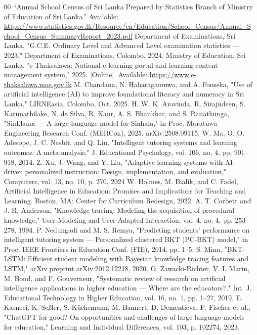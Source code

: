 \documentclass[conference]{IEEEtran}
\begin{document}
{\footnotesize
\begin{thebibliography}{00}
 “Annual School Census of Sri Lanka Prepared by Statistics Branch of Ministry of Education of Sri Lanka.” Available: \url{https://www.statistics.gov.lk/Resource/en/Education/School_Census/Annual_School_Census_SummaryReport_2023.pdf}
 Department of Examinations, Sri Lanka, "G.C.E. Ordinary Level and Advanced Level examination statistics — 2023," Department of Examinations, Colombo, 2024. 
 Ministry of Education, Sri Lanka, "e-Thaksalawa: National e-learning portal and learning content management system," 2025. [Online]. Available: \url{https://www.e-thaksalawa.moe.gov.lk}
 M. Chandana, N. Habaragamuwa, and A. Fonseka, "Use of artificial intelligence (AI) to improve foundational literacy and numeracy in Sri Lanka," LIRNEasia, Colombo, Oct. 2025.
 H. W. K. Aravinda, R. Sirajudeen, S. Karunathilake, N. de Silva, R. Kaur, A. S. Bhankhar, and S. Ranathunga, "SinLlama — A large language model for Sinhala," in Proc. Moratuwa Engineering Research Conf. (MERCon), 2025. arXiv:2508.09115. 
 W. Ma, O. O. Adesope, J. C. Nesbit, and Q. Liu, "Intelligent tutoring systems and learning outcomes: A meta-analysis," J. Educational Psychology, vol. 106, no. 4, pp. 901–918, 2014. 
 Z. Xu, J. Wang, and Y. Liu, "Adaptive learning systems with AI-driven personalized instruction: Design, implementation, and evaluation," Computers, vol. 13, no. 10, p. 270, 2024 
 W. Holmes, M. Bialik, and C. Fadel, Artificial Intelligence in Education: Promises and Implications for Teaching and Learning. Boston, MA: Center for Curriculum Redesign, 2022. 
 A. T. Corbett and J. R. Anderson, "Knowledge tracing: Modeling the acquisition of procedural knowledge," User Modeling and User-Adapted Interaction, vol. 4, no. 4, pp. 253–278, 1994. 
 P. Nedungadi and M. S. Remya, "Predicting students' performance on intelligent tutoring system — Personalized clustered BKT (PC-BKT) model," in Proc. IEEE Frontiers in Education Conf. (FIE), 2014, pp. 1–5.
 S. Minn, "BKT-LSTM: Efficient student modeling with Bayesian knowledge tracing features and LSTM," arXiv preprint arXiv:2012.12218, 2020. 
 O. Zawacki-Richter, V. I. Marin, M. Bond, and F. Gouverneur, "Systematic review of research on artificial intelligence applications in higher education — Where are the educators?," Int. J. Educational Technology in Higher Education, vol. 16, no. 1, pp. 1–27, 2019. 
 E. Kasneci, K. Seßler, S. Küchemann, M. Bannert, D. Dementieva, F. Fischer et al., "ChatGPT for good? On opportunities and challenges of large language models for education," Learning and Individual Differences, vol. 103, p. 102274, 2023. 

\end{thebibliography}}
\end{document}

